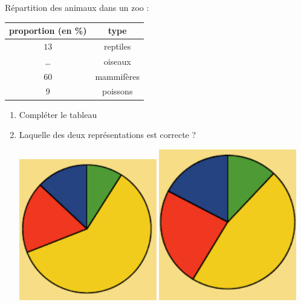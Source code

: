 
\begin{mental}
    Répartition des animaux dans un zoo :
    \begin{center}
    \begin{tabular}[]{|c||c|}
        \hline
        proportion (en \%)&type\\
        \hline\hline
        \( 13\)&reptiles\\
        \hline
        \ldots&oiseaux\\
        \hline
        60&mammifères\\
        \hline
        9&poissons\\
        \hline
    \end{tabular}
    \end{center}


    \begin{enumerate}
        \item
            Compléter le tableau
        \item
            Laquelle des deux représentations est correcte ?

            \begin{center}
                
\includegraphics[width=6cm]{53_diag.pdf}
\hspace{2cm}
\includegraphics[width=6cm]{54_diag.pdf}
            \end{center}
            

    \end{enumerate}
    
\end{mental}
